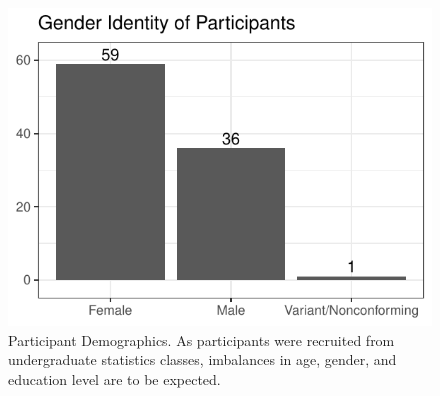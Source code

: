 \documentclass[runningheads
]{llncs}
\begin{document}
\begin{figure}
\begin{minipage}[t]{0.33\linewidth}
{{\includegraphics{index_files/figure-pdf/fig-demographics-2.pdf}

}

}

\end{minipage}%
%
\begin{minipage}[t]{0.33\linewidth}

{\centering 


}

\end{minipage}%

\caption{\label{fig-demographics}Participant Demographics. As
participants were recruited from undergraduate statistics classes,
imbalances in age, gender, and education level are to be expected.}

\end{figure}
\end{document}
